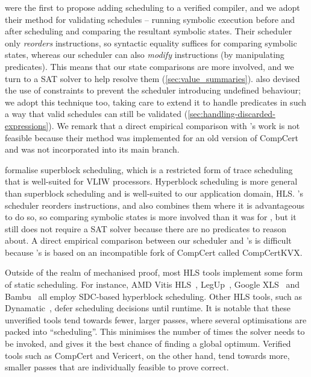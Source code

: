 \textcite{tristan08_formal_verif_trans_valid} were the first to propose adding
scheduling to a verified compiler, and we adopt their method for validating
schedules -- running symbolic execution before and after scheduling and
comparing the resultant symbolic states.  Their scheduler only \emph{reorders}
instructions, so syntactic equality suffices for comparing symbolic states,
whereas our scheduler can also \emph{modify} instructions (by manipulating
predicates).  This means that our state comparisons are more involved, and we
turn to a SAT solver to help resolve them
(\cref{sec:value_summaries}).  \citeauthor{tristan08_formal_verif_trans_valid}
also devised the use of constraints to prevent the scheduler introducing
undefined behaviour; we adopt this technique too, taking care to extend it to
handle predicates in such a way that valid schedules can still be validated
(\cref{sec:handling-discarded-expressions}).  We remark that a direct empirical
comparison with \citeauthor{tristan08_formal_verif_trans_valid}'s work is not
feasible because their method was implemented for an old version of CompCert and
was not incorporated into its main branch.

\textcite{six22_formal_verif_super_sched} formalise superblock scheduling, which
is a restricted form of trace scheduling that is well-suited for VLIW
processors.  Hyperblock scheduling is more general than superblock scheduling
and is well-suited to our application domain, \gls{HLS}.\@
\citeauthor{six22_formal_verif_super_sched}'s scheduler reorders instructions,
and also combines them where it is advantageous to do so, so comparing symbolic
states is more involved than it was for
\citeauthor{tristan08_formal_verif_trans_valid}, but it still does not require a
SAT solver because there are no predicates to reason about.  A direct empirical
comparison between our scheduler and
\citeauthor{six22_formal_verif_super_sched}'s is difficult because
\citeauthor{six22_formal_verif_super_sched}'s is based on an incompatible fork
of CompCert called CompCertKVX.

Outside of the realm of mechanised proof, most \gls{HLS} tools implement some
form of static scheduling.  For instance, AMD Vitis
HLS~\cite{amd23_vitis_forum}, LegUp~\cite[][p.60]{canis15_legup}, Google
XLS~\cite[line~112]{google23_xls} and Bambu~\cite[line~304]{ferrandi21_bambu}
all employ SDC-based hyperblock scheduling.  Other \gls{HLS} tools, such as
Dynamatic~\cite{josipović18_dynam_sched_high_synth}, defer scheduling decisions
until runtime.  It is notable that these unverified tools tend towards fewer,
larger passes, where several optimisations are packed into \enquote{scheduling}.
This minimises the number of times the solver needs to be invoked, and gives it
the best chance of finding a global optimum. Verified tools such as CompCert and
Vericert, on the other hand, tend towards more, smaller passes that are
individually feasible to prove correct.

